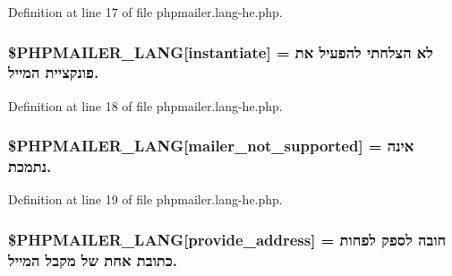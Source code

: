 Definition at line 17 of file phpmailer.\+lang-\/he.\+php.

\subsubsection[{\texorpdfstring{\$\+P\+H\+P\+M\+A\+I\+L\+E\+R\+\_\+\+L\+A\+NG}{$PHPMAILER_LANG}}]{\setlength{\rightskip}{0pt plus 5cm}\$P\+H\+P\+M\+A\+I\+L\+E\+R\+\_\+\+L\+A\+NG\mbox{[}\textquotesingle{}instantiate\textquotesingle{}\mbox{]} = \textquotesingle{}לא הצלחתי להפעיל את פונקציית המייל.\textquotesingle{}}\hypertarget{phpmailer_8lang-he_8php_ad58dde16780f4770ccf4dd282ea1f5ad}{}\label{phpmailer_8lang-he_8php_ad58dde16780f4770ccf4dd282ea1f5ad}


Definition at line 18 of file phpmailer.\+lang-\/he.\+php.

\subsubsection[{\texorpdfstring{\$\+P\+H\+P\+M\+A\+I\+L\+E\+R\+\_\+\+L\+A\+NG}{$PHPMAILER_LANG}}]{\setlength{\rightskip}{0pt plus 5cm}\$P\+H\+P\+M\+A\+I\+L\+E\+R\+\_\+\+L\+A\+NG\mbox{[}\textquotesingle{}mailer\+\_\+not\+\_\+supported\textquotesingle{}\mbox{]} = \textquotesingle{} אינה נתמכת.\textquotesingle{}}\hypertarget{phpmailer_8lang-he_8php_aa2ebcb8833ee83a7ad67401c4bb3a6ad}{}\label{phpmailer_8lang-he_8php_aa2ebcb8833ee83a7ad67401c4bb3a6ad}


Definition at line 19 of file phpmailer.\+lang-\/he.\+php.

\subsubsection[{\texorpdfstring{\$\+P\+H\+P\+M\+A\+I\+L\+E\+R\+\_\+\+L\+A\+NG}{$PHPMAILER_LANG}}]{\setlength{\rightskip}{0pt plus 5cm}\$P\+H\+P\+M\+A\+I\+L\+E\+R\+\_\+\+L\+A\+NG\mbox{[}\textquotesingle{}provide\+\_\+address\textquotesingle{}\mbox{]} = \textquotesingle{}חובה לספק לפחות כתובת אחת של מקבל המייל.\textquotesingle{}}\hypertarget{phpmailer_8lang-he_8php_a8b97897c2406b7392b056f375feeefbb}{}\label{phpmailer_8lang-he_8php_a8b97897c2406b7392b056f375feeefbb}


